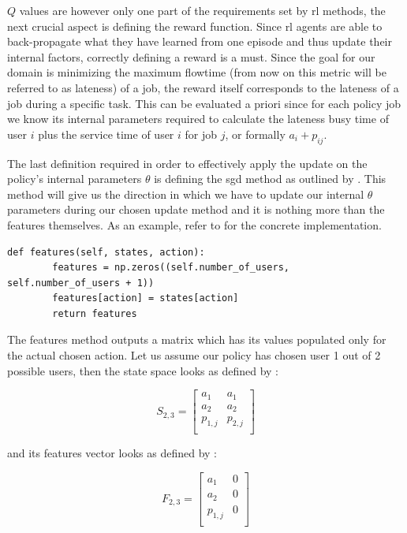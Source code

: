 \documentclass{seal_thesis}
\begin{document}
 $Q$ values are however only one part of the requirements set by \gls{rl} methods, the next crucial aspect is defining the reward function. Since \gls{rl} agents are able to back-propagate what they have learned from one episode and thus update their internal factors, correctly defining a reward is a must. Since the goal for our domain is minimizing the maximum flowtime (from now on this metric will be referred to as lateness) of a job, the reward itself corresponds to the lateness of a job during a specific task. This can be evaluated a priori since for each policy job we know its internal parameters required to calculate the lateness \ie busy time of user $i$ plus the service time of user $i$ for job $j$, or formally $a_i+p_{ij}$.

 The last definition required in order to effectively apply the update on the policy's internal parameters $\theta$ is defining the \gls{sgd} method as outlined by . This method will give us the direction in which we have to update our internal $\theta$ parameters during our chosen update method and it is nothing more than the features themselves. As an example, refer to  for the concrete implementation.

 \begin{lstlisting}[caption=Features definition,label=lst:features_definition,style=CustomPython]
    def features(self, states, action):
        features = np.zeros((self.number_of_users, self.number_of_users + 1))
        features[action] = states[action]
        return features
\end{lstlisting}

The features method outputs a matrix which has its values populated only for the actual chosen action. Let us assume our policy has chosen user 1 out of 2 possible users, then the state space looks as defined by :

\begin{equation}
\label{eq:kbatch_sp_ex}
	S_{2,3} = 
	\begin{bmatrix}
	a_1 & a_1 \\
	a_2 & a_2 \\
	p_{1,j} & p_{2,j} \\
	\end{bmatrix}
\end{equation}

and its features vector looks as defined by :

\begin{equation}
\label{eq:kbatch_features_ex}
	F_{2,3} = 
	\begin{bmatrix}
	a_1 & 0 \\
	a_2 & 0 \\
	p_{1,j} & 0 \\
	\end{bmatrix}
\end{equation}
\end{document}
